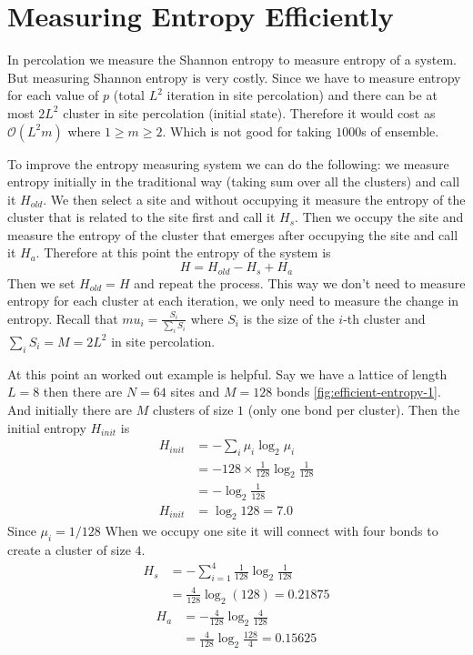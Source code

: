 \ifpdf
\graphicspath{{Appendix4/figs/}}
\else
\graphicspath{{Appendix4/figs/}}
\fi

\chapter{Measuring Entropy Efficiently}
	In percolation we measure the Shannon entropy \cite{Shannon1948} to measure entropy of a system. But measuring Shannon entropy is very costly. Since we have to measure entropy for each value of $p$ (total $L^2$ iteration in site percolation) and there can be at most $2L^2$ cluster in site percolation (initial state). Therefore it would cost as $\mathcal{O} (L^2m)$ where $1 \geq m \geq 2$. Which is not good for taking $1000$s of ensemble.

	To improve the entropy measuring system we can do the following: we measure entropy initially in the traditional way (taking sum over all the clusters) and call it $H_{old}$. We then select a site and without occupying it measure the entropy of the cluster that is related to the site first and call it $H_s$. Then we occupy the site and measure the entropy of the cluster that emerges after occupying the site and call it $H_a$. Therefore at this point the entropy of the system is
	\begin{equation}
		H = H_{old} - H_s + H_a
	\end{equation}
	Then we set $H_{old} = H$ and repeat the process. This way we don't need to measure entropy for each cluster at each iteration, we only need to measure the change in entropy. Recall that $mu_i=\frac{S_i}{\sum_i S_i}$ where $S_i$ is the size of the $i$-th cluster and $\sum_i S_i = M = 2L^2$ in site percolation.
	
	At this point an worked out example is helpful. Say we have a lattice of length $L=8$ then there are $N=64$ sites and $M=128$ bonds \ref{fig:efficient-entropy-1}. And initially there are $M$ clusters of size $1$ (only one bond per cluster). Then the initial entropy $H_{init}$ is
	\begin{align}
		H_{init} &= -\sum_{i} \mu_i \log_2 \mu_i \nonumber\\
		  &= -128 \times \frac{1}{128} \log_2 \frac{1}{128} \nonumber\\
		  &= -\log_2 \frac{1}{128} \nonumber\\
		H_{init}  &= \log_2 128 = 7.0
	\end{align}	
	Since $\mu_i = 1/128$
	When we occupy one site it will connect with four bonds to create a cluster of size $4$.
	\begin{align}
		H_{s} 
		&= - \sum_{i=1}^{4} \frac{1}{128} \log_2 \frac{1}{128} \nonumber \\
		&= \frac{4}{128} \log_2(128) = 0.21875
	\end{align}
	\begin{align}
		H_{a} 
		&= -\frac{4}{128} \log_2 \frac{4}{128} \nonumber \\
		&= \frac{4}{128} \log_2 \frac{128}{4} = 0.15625
	\end{align}
	
